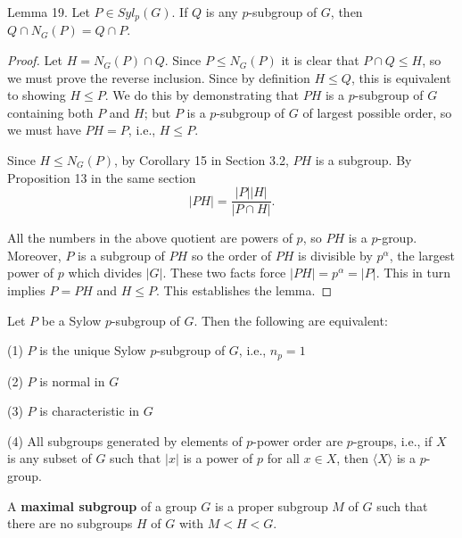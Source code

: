 \begin{lemma}
    Lemma 19. Let $P \in S y l_p(G)$. If $Q$ is any $p$-subgroup of $G$, then $Q \cap N_G(P)=Q \cap P$.
    \begin{proof}
        Let $H=N_G(P) \cap Q$. Since $P \leq N_G(P)$ it is clear that $P \cap Q \leq H$, so we must prove the reverse inclusion. Since by definition $H \leq Q$, this is equivalent to showing $H \leq P$. We do this by demonstrating that $P H$ is a $p$-subgroup of $G$ containing both $P$ and $H$; but $P$ is a $p$-subgroup of $G$ of largest possible order, so we must have $P H=P$, i.e., $H \leq P$.

        Since $H \leq N_G(P)$, by Corollary 15 in Section 3.2, $P H$ is a subgroup. By Proposition 13 in the same section
        \begin{equation*}
            |P H|=\frac{|P||H|}{|P \cap H|} .
        \end{equation*}

        All the numbers in the above quotient are powers of $p$, so $P H$ is a $p$-group. Moreover, $P$ is a subgroup of $P H$ so the order of $P H$ is divisible by $p^\alpha$, the largest power of $p$ which divides $|G|$. These two facts force $|P H|=p^\alpha=|P|$. This in turn implies $P=P H$ and $H \leq P$. This establishes the lemma.
    \end{proof}
\end{lemma}
\begin{corollary}
    Let $P$ be a Sylow $p$-subgroup of $G$. Then the following are equivalent:

    (1) $P$ is the unique Sylow $p$-subgroup of $G$, i.e., $n_p=1$

    (2) $P$ is normal in $G$

    (3) $P$ is characteristic in $G$

    (4) All subgroups generated by elements of $p$-power order are $p$-groups, i.e., if $X$ is any subset of $G$ such that $|x|$ is a power of $p$ for all $x \in X$, then $\langle X\rangle$ is a $p$-group.
\end{corollary}
\begin{definition}
    A \textbf{maximal subgroup} of a group $G$ is a proper subgroup $M$ of $G$ such that there are no subgroups $H$ of $G$ with $M<H<G$.
\end{definition}


















